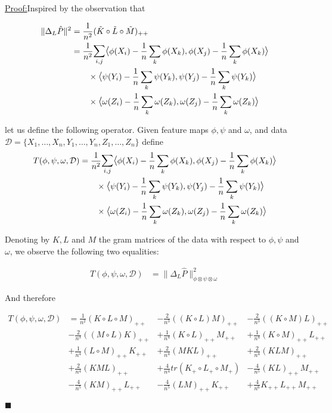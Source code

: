 \documentclass{article}
\newenvironment{claimproof}[1]{\par\noindent\underline{Proof:}\space#1}{\hfill $\blacksquare$}
\begin{document}
\begin{claimproof}
Inspired by the observation that

\begin{align*}
\|\Delta_L \hat{P}\|^2 &= \frac{1}{n^2}(\tilde{K}\circ\tilde{L}\circ\tilde{M})_{++}\\&=
\frac{1}{n^2}\mathlarger{\sum}_{i,j}\mathlarger{\langle} \phi(X_i) - \frac{1}{n}\sum_k \phi(X_k), \phi(X_j) - \frac{1}{n}\sum_k \phi(X_k) \mathlarger{\rangle}\\ &\quad \quad \times
\mathlarger{\langle} \psi(Y_i) - \frac{1}{n}\sum_k \psi(Y_k), \psi(Y_j) - \frac{1}{n}\sum_k \psi(Y_k) \mathlarger{\rangle} \\ & \quad \quad  \times 
\mathlarger{\langle} \omega(Z_i) - \frac{1}{n}\sum_k \omega(Z_k), \omega(Z_j) - \frac{1}{n}\sum_k \omega(Z_k) \mathlarger{\rangle}
\end{align*}

let us define the following operator. Given feature maps $\phi, \psi$ and $\omega$, and data $\mathcal{D} = \{X_1,\ldots,X_n,Y_1,\ldots, Y_n, Z_1,\ldots,Z_n\}$ define
\begin{align*}
T(\phi,\psi,\omega,\mathcal{D}) &=
\frac{1}{n^2}\mathlarger{\sum}_{i,j}\mathlarger{\langle} \phi(X_i) - \frac{1}{n}\sum_k \phi(X_k), \phi(X_j) - \frac{1}{n}\sum_k \phi(X_k)  \mathlarger{\rangle}\\ & \quad \quad \times \mathlarger{\langle} \psi(Y_i) - \frac{1}{n}\sum_k \psi(Y_k), \psi(Y_j) - \frac{1}{n}\sum_k \psi(Y_k) \mathlarger{\rangle} \\ & \quad \quad  \times \mathlarger{\langle} \omega(Z_i) - \frac{1}{n}\sum_k \omega(Z_k), \omega(Z_j) - \frac{1}{n}\sum_k \omega(Z_k) \mathlarger{\rangle}
\end{align*}

Denoting by $K,L$ and $M$ the gram matrices of the data with respect to $\phi, \psi$ and $\omega$, we observe the following two equalities:

\begin{align*}
T(\phi,\psi,\omega,\mathcal{D}) &= \|\Delta_L \hat{P}\|_{\phi\otimes\psi\otimes\omega}^2
\end{align*}

And therefore

\begin{align*}
T(\phi,\psi,\omega,\mathcal{D}) &= \frac{1}{n^2}(K \circ L\circ M)_{++} &-
\frac{2}{n^3}((K\circ L) M)_{++} & - 
\frac{2}{n^3}((K \circ M) L)_{++} \\&- 
\frac{2}{n^3}((M \circ L) K)_{++} &+ 
\frac{1}{n^4}(K \circ L)_{++} M_{++} &+ 
\frac{1}{n^4}(K \circ M)_{++} L_{++} \\&+ 
\frac{1}{n^4}(L \circ M)_{++} K_{++} &+ 
\frac{2}{n^4}(MKL)_{++} &+ 
\frac{2}{n^4}(KLM)_{++} \\&+ 
\frac{2}{n^4}(KML)_{++} &+ 
\frac{4}{n^4}tr(K_+ \circ L_+ \circ M_+) &-
\frac{4}{n^5}(K L)_{++} M_{++} \\& - 
\frac{4}{n^5}(KM)_{++}L_{++} &- 
\frac{4}{n^5}(LM)_{++} K_{++} &+
\frac{4}{n^6}K_{++} L_{++} M_{++}
\end{align*}


\end{claimproof}
\end{document}
